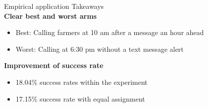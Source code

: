 \documentclass[11pt,table]{beamer}
\begin{document}
\begin{frame}{Empirical application \citep{Kasy2021}}
\renewcommand{\baselinestretch}{1}
\textcolor{BrewerRed}{Takeaways}\\
\textbf{Clear best and worst arms}
\begin{itemize}
    \item Best: Calling farmers at 10 am after a message an hour ahead
    \item Worst: Calling at 6:30 pm without a text message alert
\end{itemize}
\textbf{Improvement of success rate}
\begin{itemize}
    \item 18.04\% success rates within the experiment
    \item 17.15\% success rate with equal assignment
\end{itemize}


\end{frame}
\end{document}
